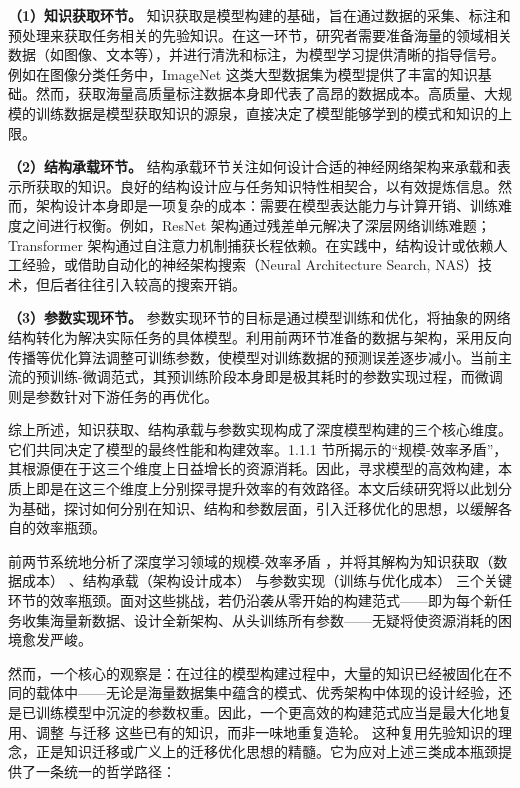 \documentclass[../main.tex]{subfiles}
\begin{document}
\textbf{（1）知识获取环节。}
知识获取是模型构建的基础，旨在通过数据的采集、标注和预处理来获取任务相关的先验知识。在这一环节，研究者需要准备海量的领域相关数据（如图像、文本等），并进行清洗和标注，为模型学习提供清晰的指导信号。例如在图像分类任务中，ImageNet 这类大型数据集为模型提供了丰富的知识基础\cite{imagenetlargescale_deng_2009}。然而，获取海量高质量标注数据本身即代表了高昂的数据成本。高质量、大规模的训练数据是模型获取知识的源泉，直接决定了模型能够学到的模式和知识的上限。

\textbf{（2）结构承载环节。}
结构承载环节关注如何设计合适的神经网络架构来承载和表示所获取的知识。良好的结构设计应与任务知识特性相契合，以有效提炼信息。然而，架构设计本身即是一项复杂的成本：需要在模型表达能力与计算开销、训练难度之间进行权衡。例如，ResNet 架构通过残差单元解决了深层网络训练难题\cite{deepresiduallearning_he_2016}；Transformer 架构通过自注意力机制捕获长程依赖\cite{attentionisall_vaswani_2017}。在实践中，结构设计或依赖人工经验，或借助自动化的神经架构搜索（Neural Architecture Search, NAS）技术\cite{neuralarchitecturesearch_elsken_2019,neuralarchitecturesearch_zoph_2017,dartsdifferentiablearchitecture_liu_2019}，但后者往往引入较高的搜索开销。

\textbf{（3）参数实现环节。}
参数实现环节的目标是通过模型训练和优化，将抽象的网络结构转化为解决实际任务的具体模型。利用前两环节准备的数据与架构，采用反向传播等优化算法调整可训练参数\cite{learningrepresentationsback_rumelhart_1986}，使模型对训练数据的预测误差逐步减小。当前主流的预训练-微调范式\cite{bertpretraining_devlin_2019}，其预训练阶段本身即是极其耗时的参数实现过程，而微调则是参数针对下游任务的再优化。

综上所述，知识获取、结构承载与参数实现构成了深度模型构建的三个核心维度。它们共同决定了模型的最终性能和构建效率。1.1.1 节所揭示的“规模-效率矛盾”，其根源便在于这三个维度上日益增长的资源消耗。因此，寻求模型的高效构建，本质上即是在这三个维度上分别探寻提升效率的有效路径。本文后续研究将以此划分为基础，探讨如何分别在知识、结构和参数层面，引入迁移优化的思想，以缓解各自的效率瓶颈。

\label{sec:ch1-1-3-research-problem-and-goals}

前两节系统地分析了深度学习领域的规模-效率矛盾 ，并将其解构为知识获取（数据成本） 、结构承载（架构设计成本） 与参数实现（训练与优化成本）  三个关键环节的效率瓶颈。面对这些挑战，若仍沿袭从零开始的构建范式——即为每个新任务收集海量新数据、设计全新架构、从头训练所有参数——无疑将使资源消耗的困境愈发严峻。

然而，一个核心的观察是：在过往的模型构建过程中，大量的知识已经被固化在不同的载体中——无论是海量数据集中蕴含的模式、优秀架构中体现的设计经验，还是已训练模型中沉淀的参数权重。因此，一个更高效的构建范式应当是最大化地复用、调整 与迁移 这些已有的知识，而非一味地重复造轮。
这种复用先验知识的理念，正是知识迁移或广义上的迁移优化思想的精髓\cite{surveytransferlearning_pan_2010}。它为应对上述三类成本瓶颈提供了一条统一的哲学路径：
\end{document}

